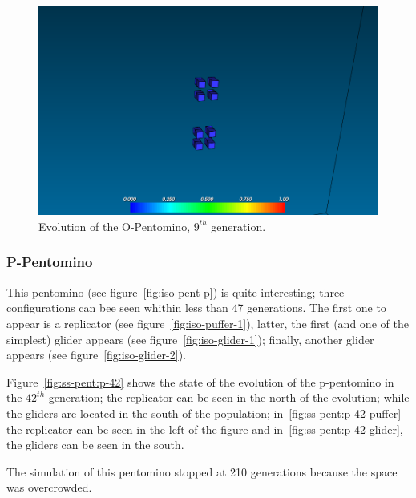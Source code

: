\begin{figure}
	\centering
	\includegraphics[scale=0.3]{pentominoes_ss/o_osc.png}
	\caption{Evolution of the O-Pentomino, $9^{th}$ generation.}
  \label{fig:ss-pent:o-osc}
\end{figure}

\subsubsection{P-Pentomino}
\label{sec:p-pentomino}

This pentomino (see figure~\ref{fig:iso-pent-p}) is quite interesting; three
configurations can bee seen whithin less than 47 generations. The first one to
appear is a replicator (see figure~\ref{fig:iso-puffer-1}), latter, the first
(and one of the simplest) glider appears (see figure~\ref{fig:iso-glider-1});
finally, another glider appears (see figure~\ref{fig:iso-glider-2}).

Figure~\ref{fig:ss-pent:p-42} shows the state of the evolution of the
p-pentomino in the $42^{th}$ generation; the replicator can be seen in the north
of the evolution; while the gliders are located in the south of the population;
in~\ref{fig:ss-pent:p-42-puffer} the replicator can be seen in the left of the
figure and in~\ref{fig:ss-pent:p-42-glider}, the gliders can be seen in the
south.

The simulation of this pentomino stopped at 210 generations because the space
was overcrowded.

